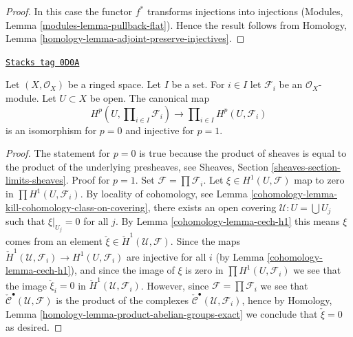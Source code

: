 \begin{proof}
In this case the functor $f^*$ transforms injections into injections
(Modules, Lemma \ref{modules-lemma-pullback-flat}).
Hence the result follows from
Homology, Lemma \ref{homology-lemma-adjoint-preserve-injectives}.
\end{proof}

\begin{lemma}
\label{cohomology-lemma-cohomology-products}
\href{https://stacks.math.columbia.edu/tag/0D0A}{\texttt{Stacks tag 0D0A}}

Let $(X, \mathcal{O}_X)$ be a ringed space. Let $I$ be a set.
For $i \in I$ let  $\mathcal{F}_i$ be an $\mathcal{O}_X$-module.
Let $U \subset X$ be open. The canonical map
$$
H^p(U, \prod\nolimits_{i \in I} \mathcal{F}_i)
\longrightarrow
\prod\nolimits_{i \in I} H^p(U, \mathcal{F}_i)
$$
is an isomorphism for $p = 0$ and injective for $p = 1$.
\end{lemma}

\begin{proof}

The statement for $p = 0$ is true because the product of sheaves
is equal to the product of the underlying presheaves, see
Sheaves, Section \ref{sheaves-section-limits-sheaves}.
Proof for $p = 1$. Set $\mathcal{F} = \prod \mathcal{F}_i$.
Let $\xi \in H^1(U, \mathcal{F})$ map to zero in
$\prod H^1(U, \mathcal{F}_i)$. By locality of cohomology, see
Lemma \ref{cohomology-lemma-kill-cohomology-class-on-covering},
there exists an open covering $\mathcal{U} : U = \bigcup U_j$ such that
$\xi|_{U_j} = 0$ for all $j$. By Lemma \ref{cohomology-lemma-cech-h1} this means
$\xi$ comes from an element
$\check \xi \in \check H^1(\mathcal{U}, \mathcal{F})$.
Since the maps
$\check H^1(\mathcal{U}, \mathcal{F}_i) \to H^1(U, \mathcal{F}_i)$
are injective for all $i$ (by Lemma \ref{cohomology-lemma-cech-h1}), and since
the image of $\xi$ is zero in $\prod H^1(U, \mathcal{F}_i)$ we see
that the image
$\check \xi_i = 0$ in $\check H^1(\mathcal{U}, \mathcal{F}_i)$.
However, since $\mathcal{F} = \prod \mathcal{F}_i$ we see that
$\check{\mathcal{C}}^\bullet(\mathcal{U}, \mathcal{F})$ is the
product of the complexes
$\check{\mathcal{C}}^\bullet(\mathcal{U}, \mathcal{F}_i)$,
hence by
Homology, Lemma \ref{homology-lemma-product-abelian-groups-exact}
we conclude that $\check \xi = 0$ as desired.
\end{proof}

